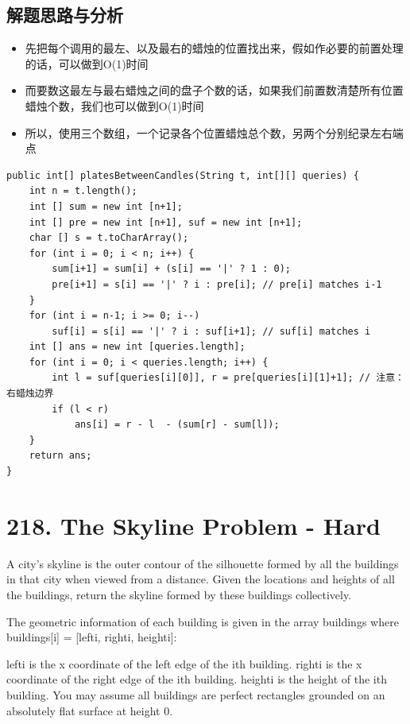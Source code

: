 \documentclass[9pt, b5paaper]{book}
\begin{document}
\subsection{解题思路与分析}
\label{sec-8-2-1}
\begin{itemize}
\item 先把每个调用的最左、以及最右的蜡烛的位置找出来，假如作必要的前置处理的话，可以做到O(1)时间
\item 而要数这最左与最右蜡烛之间的盘子个数的话，如果我们前置数清楚所有位置蜡烛个数，我们也可以做到O(1)时间
\item 所以，使用三个数组，一个记录各个位置蜡烛总个数，另两个分别纪录左右端点
\end{itemize}
\begin{verbatim}
public int[] platesBetweenCandles(String t, int[][] queries) { 
    int n = t.length();
    int [] sum = new int [n+1];
    int [] pre = new int [n+1], suf = new int [n+1];
    char [] s = t.toCharArray();
    for (int i = 0; i < n; i++) {
        sum[i+1] = sum[i] + (s[i] == '|' ? 1 : 0);
        pre[i+1] = s[i] == '|' ? i : pre[i]; // pre[i] matches i-1
    }
    for (int i = n-1; i >= 0; i--)
        suf[i] = s[i] == '|' ? i : suf[i+1]; // suf[i] matches i
    int [] ans = new int [queries.length];
    for (int i = 0; i < queries.length; i++) {
        int l = suf[queries[i][0]], r = pre[queries[i][1]+1]; // 注意： 右蜡烛边界 
        if (l < r)
            ans[i] = r - l  - (sum[r] - sum[l]);
    }
    return ans;
}
\end{verbatim}

\section{218. The Skyline Problem - Hard}
\label{sec-8-3}
A city's skyline is the outer contour of the silhouette formed by all the buildings in that city when viewed from a distance. Given the locations and heights of all the buildings, return the skyline formed by these buildings collectively.

The geometric information of each building is given in the array buildings where buildings[i] = [lefti, righti, heighti]:

lefti is the x coordinate of the left edge of the ith building.
righti is the x coordinate of the right edge of the ith building.
heighti is the height of the ith building.
You may assume all buildings are perfect rectangles grounded on an absolutely flat surface at height 0.
\end{document}

